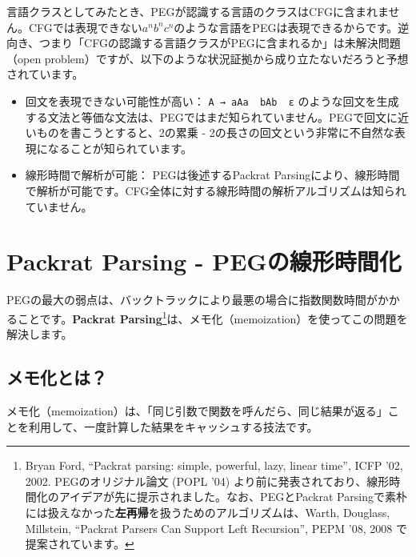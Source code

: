 言語クラスとしてみたとき、PEGが認識する言語のクラスはCFGに含まれません。CFGでは表現できない\(a^n b^n c^n\)のような言語をPEGは表現できるからです。逆向き、つまり「CFGの認識する言語クラスがPEGに含まれるか」は未解決問題（open
problem）ですが、以下のような状況証拠から成り立たないだろうと予想されています。

\begin{itemize}
\tightlist
\item
  回文を表現できない可能性が高い：
  \texttt{A\ →\ aAa\ \textbar{}\ bAb\ \textbar{}\ ε}
  のような回文を生成する文法と等価な文法は、PEGではまだ知られていません。PEGで回文に近いものを書こうとすると、2の累乗
  - 2の長さの回文という非常に不自然な表現になることが知られています。
\item
  線形時間で解析が可能： PEGは後述するPackrat
  Parsingにより、線形時間で解析が可能です。CFG全体に対する線形時間の解析アルゴリズムは知られていません。
\end{itemize}

\hypertarget{chapter5-packrat-parsing---pegux306eux7ddaux5f62ux6642ux9593ux5316}{%
\section{Packrat Parsing -
PEGの線形時間化}\label{chapter5-packrat-parsing---pegux306eux7ddaux5f62ux6642ux9593ux5316}}

PEGの最大の弱点は、バックトラックにより最悪の場合に指数関数時間がかかることです。\textbf{Packrat
Parsing}\footnote{Bryan Ford, ``Packrat parsing: simple, powerful, lazy,
  linear time'', ICFP '02, 2002. PEGのオリジナル論文 (POPL '04)
  より前に発表されており、線形時間化のアイデアが先に提示されました。なお、PEGとPackrat
  Parsingで素朴には扱えなかった\textbf{左再帰}を扱うためのアルゴリズムは、Warth,
  Douglass, Millstein, ``Packrat Parsers Can Support Left Recursion'',
  PEPM '08, 2008 で提案されています。}は、メモ化（memoization）を使ってこの問題を解決します。

\hypertarget{chapter5-ux30e1ux30e2ux5316ux3068ux306f}{%
\subsection{メモ化とは？}\label{chapter5-ux30e1ux30e2ux5316ux3068ux306f}}

メモ化（memoization）は、「同じ引数で関数を呼んだら、同じ結果が返る」ことを利用して、一度計算した結果をキャッシュする技法です。

